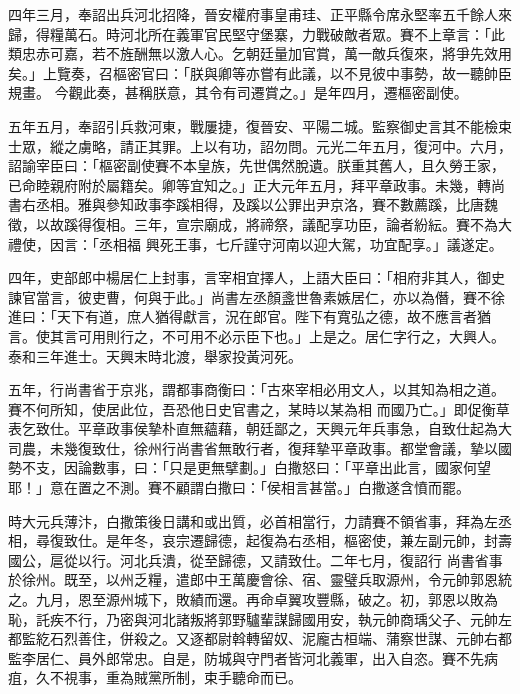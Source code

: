 \begin{pinyinscope}
 四年三月，奉詔出兵河北招降，晉安權府事皇甫珪、正平縣令席永堅率五千餘人來歸，得糧萬石。時河北所在義軍官民堅守堡寨，力戰破敵者眾。賽不上章言：「此類忠赤可嘉，若不旌酬無以激人心。乞朝廷量加官賞，萬一敵兵復來，將爭先效用矣。」上覽奏，召樞密官曰：「朕與卿等亦嘗有此議，以不見彼中事勢，故一聽帥臣規畫。
 今觀此奏，甚稱朕意，其令有司遷賞之。」是年四月，遷樞密副使。



 五年五月，奉詔引兵救河東，戰屢捷，復晉安、平陽二城。監察御史言其不能檢束士眾，縱之虜略，請正其罪。上以有功，詔勿問。元光二年五月，復河中。六月，詔諭宰臣曰：「樞密副使賽不本皇族，先世偶然脫遺。朕重其舊人，且久勞王家，已命睦親府附於屬籍矣。卿等宜知之。」正大元年五月，拜平章政事。未幾，轉尚書右丞相。雅與參知政事李蹊相得，及蹊以公罪出尹京洛，賽不數薦蹊，比唐魏徵，以故蹊得復相。三年，宣宗廟成，將禘祭，議配享功臣，論者紛紜。賽不為大禮使，因言：「丞相福
 興死王事，七斤謹守河南以迎大駕，功宜配享。」議遂定。



 四年，吏部郎中楊居仁上封事，言宰相宜擇人，上語大臣曰：「相府非其人，御史諫官當言，彼吏曹，何與于此。」尚書左丞顏盞世魯素嫉居仁，亦以為僭，賽不徐進曰：「天下有道，庶人猶得獻言，況在郎官。陛下有寬弘之德，故不應言者猶言。使其言可用則行之，不可用不必示臣下也。」上是之。居仁字行之，大興人。泰和三年進士。天興末時北渡，舉家投黃河死。



 五年，行尚書省于京兆，謂都事商衡曰：「古來宰相必用文人，以其知為相之道。賽不何所知，使居此位，吾恐他日史官書之，某時以某為相
 而國乃亡。」即促衡草表乞致仕。平章政事侯摯朴直無蘊藉，朝廷鄙之，天興元年兵事急，自致仕起為大司農，未幾復致仕，徐州行尚書省無敢行者，復拜摯平章政事。都堂會議，摯以國勢不支，因論數事，曰：「只是更無擘劃。」白撒怒曰：「平章出此言，國家何望耶！」意在置之不測。賽不顧謂白撒曰：「侯相言甚當。」白撒遂含憤而罷。



 時大元兵薄汴，白撒策後日講和或出質，必首相當行，力請賽不領省事，拜為左丞相，尋復致仕。是年冬，哀宗遷歸德，起復為右丞相，樞密使，兼左副元帥，封壽國公，扈從以行。河北兵潰，從至歸德，又請致仕。二年七月，復詔行
 尚書省事於徐州。既至，以州乏糧，遣郎中王萬慶會徐、宿、靈璧兵取源州，令元帥郭恩統之。九月，恩至源州城下，敗績而還。再命卓翼攻豐縣，破之。初，郭恩以敗為恥，託疾不行，乃密與河北諸叛將郭野驢輩謀歸國用安，執元帥商瑀父子、元帥左都監紇石烈善住，併殺之。又逐都尉斡轉留奴、泥龐古桓端、蒲察世謀、元帥右都監李居仁、員外郎常忠。自是，防城與守門者皆河北義軍，出入自恣。賽不先病疽，久不視事，重為賊黨所制，束手聽命而已。




\end{pinyinscope}
